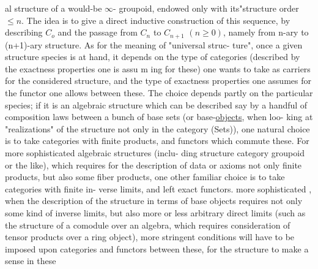 
al structure of a would-be $\infty$- groupoid,  endowed only with its"structure 
order $\leqslant n$. The idea is to give a direct inductive construction of this
sequence,  by describing $C_o$\hand{,} and the passage from $C_n$ to $C_{n+1}$ $(n \geqslant 0)$,  namely
from n-ary to (n+1)-ary structure.  As for the meaning of "universal struc-%
ture",  once a given structure species is at hand,  it depends
on the type of categories (described by the exactness properties one is assu%
m ing for these) one wants to take as carriers for the considered structure,
and the type of exactness properties one assumes for the functor one allows
between these.  The choice depends partly on the particular species;
if it is an algebraic structure which can be described say by a handful of
composition laws between a bunch of base sets (or base-\uline{objects}, when loo-%
king at "realizations" of the structure not only in the category (Sets)),
one natural choice is to take categories with finite products, and functors
which commute  these.  For more sophisticated algebraic structures (inclu-%
ding structure  category groupoid or the like),  which requires for the
description of data or axioms not only finite products, but also some fiber
products,  one other familiar choice is to take categories with finite in-%
verse limits, and left exact functors.   more sophisticated  ,
when the description of the structure in terms of base objects requires
not only some kind of inverse limits,  but also more or less arbitrary
direct limits (such as the structure of a comodule over an algebra, which
requires consideration of tensor products over a ring object),  
more stringent  conditions will have to be imposed upon categories and
functors between these,  for the structure to make a sense in  these
